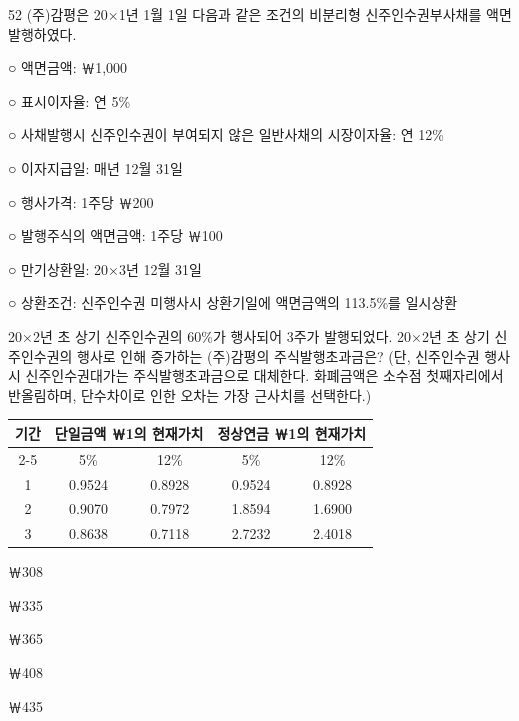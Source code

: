 \begin{question}{52}
(주)감평은 20×1년 1월 1일 다음과 같은 조건의 비분리형 신주인수권부사채를 액면발행하였다.
\begin{framedtext}
○ 액면금액: ￦1,000 \par
○ 표시이자율: 연 5\% \par
○ 사채발행시 신주인수권이 부여되지 않은 일반사채의 시장이자율: 연 12\% \par
○ 이자지급일: 매년 12월 31일 \par
○ 행사가격: 1주당 ￦200 \par
○ 발행주식의 액면금액: 1주당 ￦100 \par
○ 만기상환일: 20×3년 12월 31일 \par
○ 상환조건: 신주인수권 미행사시 상환기일에 액면금액의 113.5\%를 일시상환
\end{framedtext}
20×2년 초 상기 신주인수권의 60\%가 행사되어 3주가 발행되었다. 20×2년 초 상기 신주인수권의 행사로 인해 증가하는 (주)감평의 주식발행초과금은? (단, 신주인수권 행사시 신주인수권대가는 주식발행초과금으로 대체한다. 화폐금액은 소수점 첫째자리에서 반올림하며, 단수차이로 인한 오차는 가장 근사치를 선택한다.)
\par{\small\centering\begin{tabular}{|c|c|c|c|c|}\hline
\multirow{2}{*}{기간} & \multicolumn{2}{c|}{단일금액 ￦1의 현재가치} & \multicolumn{2}{c|}{정상연금 ￦1의 현재가치} \tabularnewline\cline{2-5}
 & 5\% & 12\% & 5\% & 12\% \tabularnewline\hline
1 & 0.9524 & 0.8928 & 0.9524 & 0.8928 \tabularnewline\hline
2 & 0.9070 & 0.7972 & 1.8594 & 1.6900 \tabularnewline\hline
3 & 0.8638 & 0.7118 & 2.7232 & 2.4018 \tabularnewline\hline
\end{tabular}\par}
\begin{choices}
  \item ￦308
  \item ￦335
  \item ￦365
  \item ￦408
  \item ￦435
\end{choices}
\end{question}
